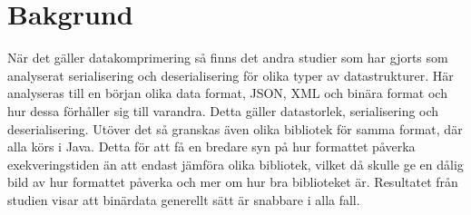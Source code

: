 \section{Bakgrund}
\label{sec:tim-background}
När det gäller datakomprimering så finns det andra studier som har gjorts som analyserat serialisering och deserialisering för olika typer av datastrukturer\cite{serialization}. Här analyseras till en början olika data format, JSON, XML och binära format och hur dessa förhåller sig till varandra. Detta gäller datastorlek, serialisering och deserialisering. Utöver det så granskas även olika bibliotek för samma format, där alla körs i Java. Detta för att få en bredare syn på hur formattet påverka exekveringstiden än att endast jämföra olika bibliotek, vilket då skulle ge en dålig bild av hur formattet påverka och mer om hur bra biblioteket är. Resultatet från studien visar att binärdata generellt sätt är snabbare i alla fall.


